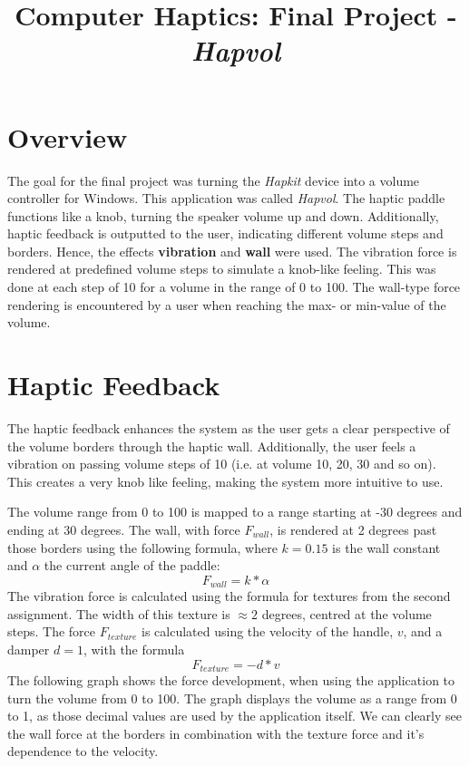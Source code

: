 



  \title{Computer Haptics: Final Project - \textit{Hapvol}}
  \maketitle

  \section*{Overview}

  The goal for the final project was turning the \textit{Hapkit} device into a volume controller for Windows. This application was called \textit{Hapvol}. The haptic paddle functions like a knob, turning the speaker volume up and down. Additionally, haptic feedback is outputted to the user, indicating different volume steps and borders. Hence, the effects \textbf{vibration} and \textbf{wall} were used. The vibration force is rendered at predefined volume steps to simulate a knob-like feeling. This was done at each step of 10 for a volume in the range of 0 to 100. The wall-type force rendering is encountered by a user when reaching the max- or min-value of the volume.

  \section*{Haptic Feedback}

  The haptic feedback enhances the system as the user gets a clear perspective of the volume borders through the haptic wall. Additionally, the user feels a vibration on passing volume steps of 10 (i.e. at volume 10, 20, 30 and so on). This creates a very knob like feeling, making the system more intuitive to use.

  The volume range from 0 to 100 is mapped to a range starting at -30 degrees and ending at 30 degrees. The wall, with force $F_{wall}$, is rendered at 2 degrees past those borders using the following formula, where $k = 0.15$ is the wall constant and $\alpha$ the current angle of the paddle:
  \begin{equation*}
    F_{wall} = k * \alpha
  \end{equation*}
  The vibration force is calculated using the formula for textures from the second assignment. The width of this texture is $\approx 2$ degrees, centred at the volume steps. The force $F_{texture}$ is calculated using the velocity of the handle, $v$, and a damper $d = 1$, with the formula
  \begin{equation*}
    F_{texture} = -d * v
  \end{equation*}
  The following graph shows the force development, when using the application to turn the volume from 0 to 100. The graph displays the volume as a range from 0 to 1, as those decimal values are used by the application itself. We can clearly see the wall force at the borders in combination with the texture force and it's dependence to the velocity.

